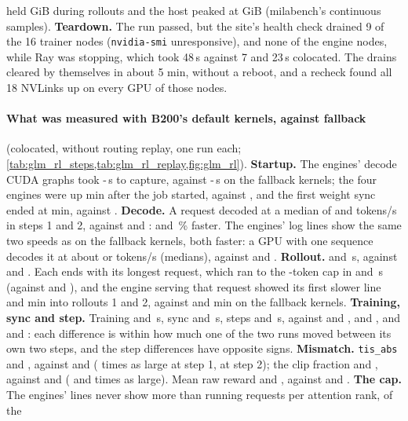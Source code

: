 held \TriGrDgGpuRollout{} GiB during rollouts and the host peaked at \TriGrDgHostEngine{} GiB (milabench's continuous samples). \textbf{Teardown.} The run passed, but the site's health check drained 9 of the 16 trainer nodes (\texttt{nvidia-smi} unresponsive), and none of the engine nodes, while Ray was stopping, which took 48\,s against 7 and 23\,s colocated. The drains cleared by themselves in about 5 min, without a reboot, and a recheck found all 18 NVLinks up on every GPU of those nodes.

\paragraph{What was measured with B200's default kernels, against fallback} (colocated, without routing replay, one run each; \cref{tab:glm_rl_steps,tab:glm_rl_replay,fig:glm_rl}). \textbf{Startup.} The engines' decode CUDA graphs took \TriGrKnGraphLo-\TriGrKnGraphHi\,s to capture, against \TriGrKnGraphRefLo-\TriGrKnGraphRefHi\,s on the fallback kernels; the four engines were up \TriGrKnEnginesUp{} min after the job started, against \TriGrEnginesUp, and the first weight sync ended at \TriGrKnStartup{} min, against \TriGrStartup. \textbf{Decode.} A request decoded at a median of \TriGrKnDecodeReqOne{} and \TriGrKnDecodeReqTwo{} tokens/s in steps 1 and 2, against \TriGrDecodeReqOne{} and \TriGrDecodeReqTwo: \TriGrKnDecodeGainOne{} and \TriGrKnDecodeGainTwo\,\% faster. The engines' log lines show the same two speeds as on the fallback kernels, both faster: a GPU with one sequence decodes it at about \TriGrKnDecodeFast{} or \TriGrKnDecodeSlow{} tokens/s (medians), against \TriGrDecodeFast{} and \TriGrDecodeSlow. \textbf{Rollout.} \TriGrKnRolloutOne{} and \TriGrKnRolloutTwo\,s, against \TriGrRolloutOne{} and \TriGrRolloutTwo. Each ends with its longest request, which ran to the \TriGrMaxResp-token cap in \TriGrKnLatMaxOne{} and \TriGrKnLatMaxTwo\,s (against \TriGrLatMaxOne{} and \TriGrLatMaxTwo), and the engine serving that request showed its first slower line \TriGrKnSwitchOne{} and \TriGrKnSwitchTwo{} min into rollouts 1 and 2, against \TriGrKnSwitchRefOne{} and \TriGrKnSwitchRefTwo{} min on the fallback kernels. \textbf{Training, sync and step.} Training \TriGrKnTrainOne{} and \TriGrKnTrainTwo\,s, sync \TriGrKnSyncOne{} and \TriGrKnSyncTwo\,s, steps \TriGrKnStepOne{} and \TriGrKnStepTwo\,s, against \TriGrTrainOne{} and \TriGrTrainTwo, \TriGrSyncOne{} and \TriGrSyncTwo, and \TriGrStepOne{} and \TriGrStepTwo: each difference is within how much one of the two runs moved between its own two steps, and the step differences have opposite signs. \textbf{Mismatch.} \texttt{tis\_abs} \TriGrKnTisAbsOne{} and \TriGrKnTisAbsTwo, against \TriGrTisAbsOne{} and \TriGrTisAbsTwo{} (\TriGrKnTisRatioOne{} times as large at step 1, \TriGrKnTisRatioTwo{} at step 2); the clip fraction \TriGrKnTisClipOne{} and \TriGrKnTisClipTwo, against \TriGrTisClipOne{} and \TriGrTisClipTwo{} (\TriGrKnClipRatioOne{} and \TriGrKnClipRatioTwo{} times as large). Mean raw reward \TriGrKnRewardOne{} and \TriGrKnRewardTwo, against \TriGrRewardOne{} and \TriGrRewardTwo. \textbf{The cap.} The engines' lines never show more than \TriGrKnRunningMax{} running requests per attention rank, of the \TriGrKnCapRank{} 